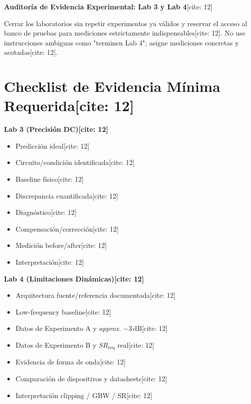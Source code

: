 \documentclass[11pt, a4paper]{article}
\begin{document}
\begin{center}
    \Large\textbf{\textcolor{ucbblue}{Auditoría de Evidencia Experimental: Lab 3 y Lab 4}}[cite: 12]
\end{center}

\begin{tcolorbox}[colback=white, colframe=black, title=\textbf{Objetivo Docente[cite: 12]}]
    \raggedright
    Cerrar los laboratorios sin repetir experimentos ya válidos y reservar el acceso al banco de pruebas para mediciones estrictamente indispensables[cite: 12]. No use instrucciones ambiguas como "terminen Lab 4"; asigne mediciones concretas y acotadas[cite: 12].
\end{tcolorbox}

\section*{Checklist de Evidencia Mínima Requerida[cite: 12]}
\begin{minipage}[t]{0.48\textwidth}
    \textbf{Lab 3 (Precisión DC)[cite: 12]}
    \begin{itemize}
        \item[$\square$] Predicción ideal[cite: 12]
        \item[$\square$] Circuito/condición identificada[cite: 12]
        \item[$\square$] Baseline físico[cite: 12]
        \item[$\square$] Discrepancia cuantificada[cite: 12]
        \item[$\square$] Diagnóstico[cite: 12]
        \item[$\square$] Compensación/corrección[cite: 12]
        \item[$\square$] Medición before/after[cite: 12]
        \item[$\square$] Interpretación[cite: 12]
    \end{itemize}
\end{minipage}
\hfill
\begin{minipage}[t]{0.48\textwidth}
    \textbf{Lab 4 (Limitaciones Dinámicas)[cite: 12]}
    \begin{itemize}
        \item[$\square$] Arquitectura fuente/referencia documentada[cite: 12]
        \item[$\square$] Low-frequency baseline[cite: 12]
        \item[$\square$] Datos de Experimento A y \textit{approx.} $-3\,\text{dB}$[cite: 12]
        \item[$\square$] Datos de Experimento B y $SR_{\mathrm{req}}$ real[cite: 12]
        \item[$\square$] Evidencia de forma de onda[cite: 12]
        \item[$\square$] Comparación de dispositivos y datasheets[cite: 12]
        \item[$\square$] Interpretación clipping / GBW / SR[cite: 12]
    \end{itemize}
\end{minipage}
\end{document}
